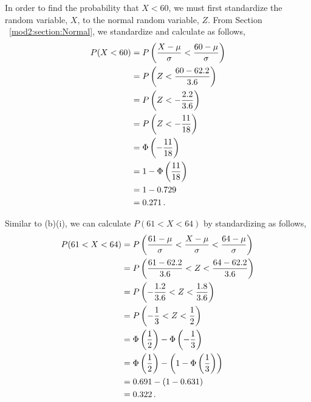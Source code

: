 \begin{subquestions}
\begin{subsubquestions}
In order to find the probability that $X<60$, we must first standardize the random variable, $X$, to the normal random variable, $Z$. From Section ~\ref{mod2:section:Normal}, we standardize and calculate as follows,
\begin{align}
	P (X<60) & = P\left(\frac{X - \mu}{\sigma} < \frac{60 - \mu}{\sigma} \right) \nonumber \\
	         & = P\left(Z < \frac{60-62.2}{3.6} \right) \nonumber \\
	         & = P\left(Z < -\frac{2.2}{3.6} \right) \nonumber \\	
	         & = P\left(Z < -\frac{11}{18} \right) \nonumber \\
	         & = \Phi\left(-\frac{11}{18} \right) \nonumber \\
	         & = 1 - \Phi\left(\frac{11}{18} \right) \nonumber \\
	         & = 1 - 0.729 \nonumber \\
	         & = 0.271 \,.	
\end{align}
	

\subsubquestion

Similar to (b)(i), we can calculate $P(61<X<64)$ by standardizing as follows,
\begin{align}
	P(61<X<64) & = P\left(\frac{61- \mu}{\sigma} < \frac{X - \mu}{\sigma} < \frac{64 - \mu}{\sigma} \right) \nonumber \\
	           & = P\left(\frac{61- 62.2}{3.6} < Z < \frac{64 - 62.2}{3.6} \right) \nonumber \\
	           & = P\left(-\frac{1.2}{3.6} < Z < \frac{1.8}{3.6} \right) \nonumber \\
	           & = P\left(-\frac{1}{3} < Z < \frac{1}{2} \right) \nonumber \\
	           & = \Phi\left(\frac{1}{2} \right) - \Phi\left(-\frac{1}{3}\right) \nonumber \\
	           & = \Phi\left(\frac{1}{2} \right) - \left(1 - \Phi\left(\frac{1}{3}\right) \right) \nonumber \\
	           & = 0.691 - (1 - 0.631) \nonumber \\
	           & = 0.322 \,.
\end{align}

\end{subsubquestions}



\end{subquestions}
